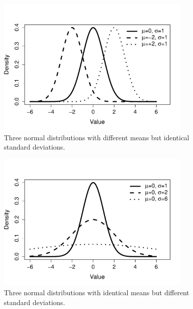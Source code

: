 \documentclass[xcolor={table}]{beamer}
\begin{document}
 \begin{frame} [plain]
\begin{figure}
\centering
\includegraphics[width=0.85\textwidth]{./images/pdf_NormalParams_mu_short.pdf}
\caption{Three normal distributions with different means but identical standard deviations.}
\label{fig:pdf_normal_means}
\end{figure}
\end{frame} 


 \begin{frame} [plain]
\begin{figure}
\centering
\includegraphics[width=0.85\textwidth]{./images/pdf_NormalParams_sigma_short.pdf}
\caption{Three normal distributions with identical means but different standard deviations.}
\label{fig:pdf_normal_means}
\end{figure}
\end{frame} 
\end{document}
